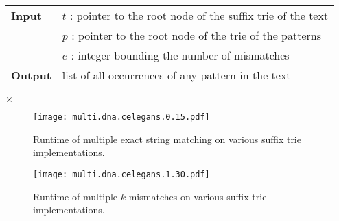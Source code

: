 \begin{center}
\begin{minipage}[t]{.8\textwidth}
\begin{algorithm}[H]
\begin{tabular}{ll}
\textbf{Input}  & $t$ : pointer to the root node of the suffix trie of the text\\
 			    & $p$ : pointer to the root node of the trie of the patterns\\
 			    & $e$ : integer bounding the number of mismatches\\
\textbf{Output} & list of all occurrences of any pattern in the text\\
\end{tabular}
\begin{algorithmic}[1]
		\State \Report {} $\times$ 
		\Repeat
			\Repeat
				\State {}
	\EndIf
\EndIf
\end{algorithmic}
\label{alg:st-hamming-multi}
\end{algorithm}
\end{minipage}
\end{center}

\begin{figure}[h]
\begin{center}
\caption[Multiple exact string matching runtime]{Runtime of multiple exact string matching on various suffix trie implementations.}
\label{fig:query-dna-exact-multi}
\texttt{[image: multi.dna.celegans.0.15.pdf]}
\end{center}
\end{figure}

\begin{figure}[h]
\begin{center}
\caption[Multiple $k$-mismatches runtime]{Runtime of multiple $k$-mismatches on various suffix trie implementations.}
\label{fig:query-dna-apx-multi}
\texttt{[image: multi.dna.celegans.1.30.pdf]}
\end{center}
\end{figure}

